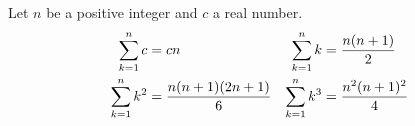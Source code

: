 \documentclass{standalone}
\begin{document}
\begin{thmBox*}
  Let $n$ be a positive integer and $c$ a real number.
  \begin{align*}
    \sum_{k=1}^n c&=cn& 
    \sum_{k=1}^n k &=\frac{n(n+1)}{2}\\
    \sum_{k=1}^n k^2&=\frac{n(n+1)(2n+1)}{6}&
    \sum_{k=1}^n k^3&=\frac{n^2(n+1)^2}{4}
  \end{align*}
\end{thmBox*}
\end{document}
